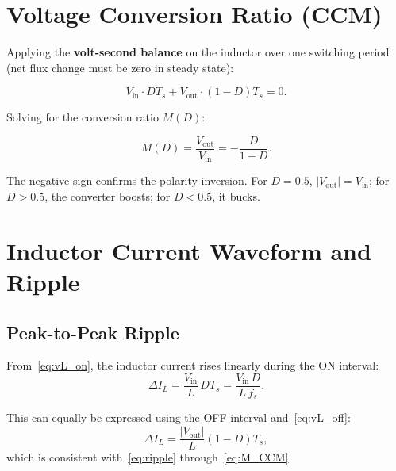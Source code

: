 \documentclass[12pt,a4paper]{article}
\newcommand{\Vin}{V_{\mathrm{in}}}
\newcommand{\Vout}{V_{\mathrm{out}}}
\newcommand{\DeltaIL}{\Delta I_L}
\newcommand{\Ts}{T_s}
\newcommand{\fs}{f_s}
\begin{document}
\section{Voltage Conversion Ratio (CCM)}
\label{sec:voltage_ratio}

Applying the \textbf{volt-second balance} on the inductor over one switching
period (net flux change must be zero in steady state):

\begin{equation}
  \Vin \cdot D\Ts + \Vout \cdot (1-D)\Ts = 0.
\end{equation}

Solving for the conversion ratio $M(D)$:

\begin{equation}
  \boxed{M(D) = \frac{\Vout}{\Vin} = -\frac{D}{1-D}.}
  \label{eq:M_CCM}
\end{equation}

The negative sign confirms the polarity inversion.
For $D = 0.5$, $|\Vout| = \Vin$; for $D > 0.5$, the converter boosts;
for $D < 0.5$, it bucks.

\section{Inductor Current Waveform and Ripple}
\label{sec:IL_waveform}

\subsection{Peak-to-Peak Ripple}

From~\eqref{eq:vL_on}, the inductor current rises linearly during the ON
interval:
\begin{equation}
  \DeltaIL = \frac{\Vin}{L}\,D\Ts = \frac{\Vin\,D}{L\,\fs}.
  \label{eq:ripple}
\end{equation}

This can equally be expressed using the OFF interval and~\eqref{eq:vL_off}:
\begin{equation}
  \DeltaIL = \frac{|\Vout|}{L}(1-D)\Ts,
\end{equation}
which is consistent with~\eqref{eq:ripple} through~\eqref{eq:M_CCM}.
\end{document}
